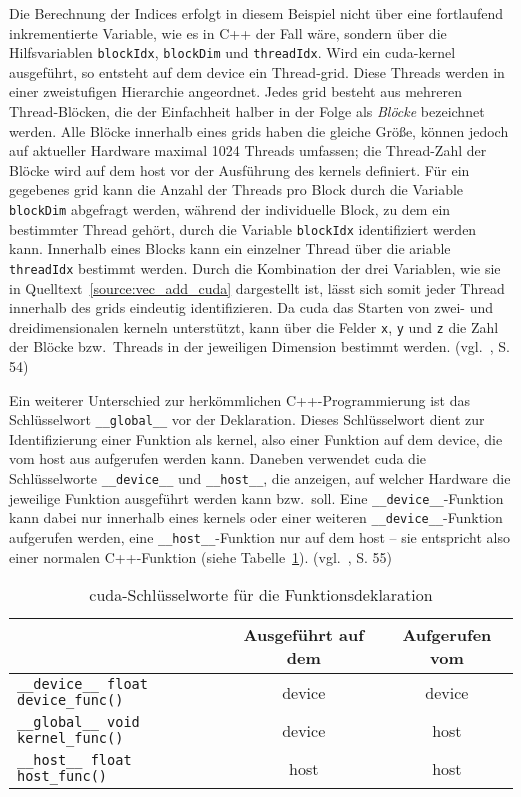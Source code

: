Die Berechnung der Indices erfolgt in diesem Beispiel nicht über eine fortlaufend inkrementierte Variable, wie es in C++
der Fall wäre, sondern über die Hilfsvariablen \texttt{blockIdx}, \texttt{blockDim} und \texttt{threadIdx}. Wird ein
\gls{cuda}-\gls{kernel} ausgeführt, so entsteht auf dem \gls{device} ein Thread-\gls{grid}. Diese Threads werden in
einer zweistufigen Hierarchie angeordnet. Jedes \gls{grid} besteht aus mehreren Thread-Blöcken, die der Einfachheit
halber in der Folge als \textit{Blöcke} bezeichnet werden. Alle Blöcke innerhalb eines \gls{grid}s haben die gleiche
Größe, können jedoch auf aktueller Hardware maximal 1024 Threads umfassen; die Thread-Zahl der Blöcke wird auf dem
\gls{host} vor der Ausführung des \gls{kernel}s definiert. Für ein gegebenes \gls{grid} kann die Anzahl der Threads pro
Block durch die Variable \texttt{blockDim} abgefragt werden, während der individuelle Block, zu dem ein bestimmter
Thread gehört, durch die Variable \texttt{blockIdx} identifiziert werden kann. Innerhalb eines Blocks kann ein einzelner
Thread über die ariable \texttt{threadIdx} bestimmt werden. Durch die Kombination der drei Variablen, wie sie in
Quelltext~\ref{source:vec_add_cuda} dargestellt ist, lässt sich somit jeder Thread innerhalb des \gls{grid}s eindeutig
identifizieren. Da \gls{cuda} das Starten von zwei- und dreidimensionalen \gls{kernel}n unterstützt, kann über die
Felder \texttt{x}, \texttt{y} und \texttt{z} die Zahl der Blöcke bzw.\ Threads in der jeweiligen Dimension bestimmt
werden. (vgl.~\cite{kirkhwu}, S. 54)

Ein weiterer Unterschied zur herkömmlichen C++-Programmierung ist das Schlüsselwort \texttt{\_\_global\_\_} vor der
Deklaration. Dieses Schlüsselwort dient zur Identifizierung einer Funktion als \gls{kernel}, also einer Funktion auf
dem \gls{device}, die vom \gls{host} aus aufgerufen werden kann. Daneben verwendet \gls{cuda} die Schlüsselworte
\texttt{\_\_device\_\_} und \texttt{\_\_host\_\_}, die anzeigen, auf welcher Hardware die jeweilige Funktion ausgeführt
werden kann bzw.\ soll. Eine \texttt{\_\_device\_\_}-Funktion kann dabei nur innerhalb eines \gls{kernel}s oder einer
weiteren \texttt{\_\_device\_\_}-Funktion aufgerufen werden, eine \texttt{\_\_host\_\_}-Funktion nur auf dem \gls{host}
-- sie entspricht also einer normalen C++-Funktion (siehe Tabelle~\ref{table:cu_func_keywords}). (vgl.~\cite{kirkhwu},
S. 55)

\begin{table}
    \centering
    \begin{tabular}{| l | c | c |}
        \hline
        & Ausgeführt auf dem & Aufgerufen vom \\
        \hline
        \texttt{\_\_device\_\_ float device\_func()} & \gls{device} & \gls{device} \\
        \hline
        \texttt{\_\_global\_\_ void kernel\_func()} & \gls{device} & \gls{host} \\
        \hline
        \texttt{\_\_host\_\_ float host\_func()} & \gls{host} & \gls{host} \\
        \hline
    \end{tabular}
    \caption{\gls{cuda}-Schlüsselworte für die Funktionsdeklaration}
    \label{table:cu_func_keywords}
\end{table}


